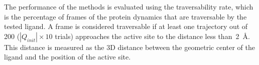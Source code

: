 \documentclass[usletter, 10pt, conference]{ieeeconf} %
\def\QI{Q_{init}}
\def\Imax{I_{max}} %
\def\LA{L_1}
\def\LB{L_2}
\def\RA{A$_{1}$}
\def\RB{A$_{2}$}
\def\RC{A$_{1}^{*}$}
\begin{document}
The performance of the methods is evaluated using the traversability rate, which is the percentage of frames of the protein dynamics that are traversable by the tested ligand.
A frame is considered traversable if at least one trajectory out of 200 ($\!|\QI|\!\times\!\!10$ trials) approaches the active site to the distance less than~2~\AA. 
This distance is measured as the 3D distance between the geometric center of the ligand and the position of the active site.


%
%
%
%
%
%
%
\end{document}
